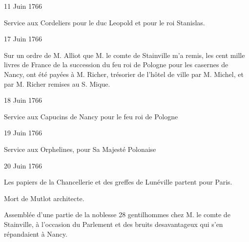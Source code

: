                      \begin{diary}{11 Juin 1766}{}
                        
                         Service aux Cordeliers pour le duc Leopold
                           et pour le roi Stanislas.
                        \bigskip
        
        
                     \end{diary}

                     \begin{diary}{17 Juin 1766}{}
                        
                         Sur un ordre de M. Alliot que M.
                              le comte de
                              Stainville m'a remis, les cent mille livres de France
                           de la succession du feu roi de Pologne pour les casernes
                              de Nancy, ont été payées à M.
                              Richer, trésorier
                           de l'hôtel de ville par M. Michel, et par M.
                              Richer remises au S.
                              Mique. \bigskip
        
        
                     \end{diary}

                     \begin{diary}{18 Juin 1766}{}
                        
                         Service aux Capucins de Nancy pour le
                              feu roi de Pologne
                        \bigskip
        
        
                     \end{diary}
                     
                     \begin{diary}{19 Juin 1766}{}
                        
                         Service aux Orphelines, pour Sa Majesté Polonaise
                        \bigskip
        
        
                     \end{diary}

                     \begin{diary}{20 Juin 1766}{}
                        
                         Les papiers de la Chancellerie et des greffes
                           de Lunéville partent pour
                              Paris. \bigskip
        
        
                         Mort de Mutlot architecte. \bigskip
        
        
                         Assemblée d'une partie de la noblesse 28 gentilhommes
                           chez
                           M. le comte de Stainville, à
                           l'occasion
                           du Parlement et des bruits
                           desavantageux
                           qui s'en répandaient à Nancy.
                        \bigskip
        
        
                     \end{diary}

